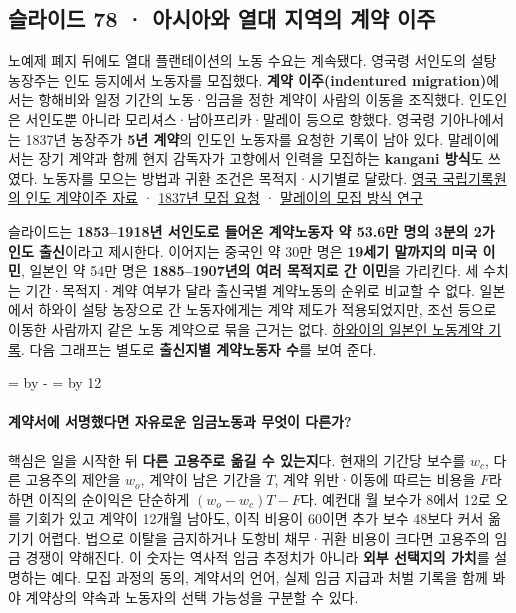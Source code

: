 \documentclass[10pt,a4paper]{article}
\newcommand{\ReserveQuestionSpace}{%
  \par\begingroup
  \dimen0=\pagegoal \advance\dimen0 by -\pagetotal
  \dimen2=\baselineskip \multiply\dimen2 by 12
  \ifdim\dimen0<\dimen2 \newpage\fi
  \endgroup}
\begin{document}
\subsection{슬라이드 78 · 아시아와 열대 지역의 계약 이주}
노예제 폐지 뒤에도 열대 플랜테이션의 노동 수요는 계속됐다. 영국령 서인도의 설탕 농장주는 인도 등지에서 노동자를 모집했다. \textbf{계약 이주(indentured migration)}에서는 항해비와 일정 기간의 노동·임금을 정한 계약이 사람의 이동을 조직했다. 인도인은 서인도뿐 아니라 모리셔스·남아프리카·말레이 등으로 향했다. 영국령 기아나에서는 1837년 농장주가 \textbf{5년 계약}의 인도인 노동자를 요청한 기록이 남아 있다. 말레이에서는 장기 계약과 함께 현지 감독자가 고향에서 인력을 모집하는 \textbf{kangani 방식}도 쓰였다. 노동자를 모으는 방법과 귀환 조건은 목적지·시기별로 달랐다. \href{https://www.nationalarchives.gov.uk/help-with-your-research/research-guides/indian-indentured-labourers/}{영국 국립기록원의 인도 계약이주 자료} · \href{https://www.nationalarchives.gov.uk/education/outreach/projects/migration-histories/indian-indentured-labour/}{1837년 모집 요청} · \href{https://www.cambridge.org/core/services/aop-cambridge-core/content/view/965FE650CE156420C32B0FE4A8261AEA/S0020859012000478a.pdf/labour-brokers-in-migration-understanding-historical-and-contemporary-transnational-migration-regimes-in-malayamalaysia.pdf}{말레이의 모집 방식 연구}\par

슬라이드는 \textbf{1853–1918년 서인도로 들어온 계약노동자 약 53.6만 명의 3분의 2가 인도 출신}이라고 제시한다. 이어지는 중국인 약 30만 명은 \textbf{19세기 말까지의 미국 이민}, 일본인 약 54만 명은 \textbf{1885–1907년의 여러 목적지로 간 이민}을 가리킨다. 세 수치는 기간·목적지·계약 여부가 달라 출신국별 계약노동의 순위로 비교할 수 없다. 일본에서 하와이 설탕 농장으로 간 노동자에게는 계약 제도가 적용되었지만, 조선 등으로 이동한 사람까지 같은 노동 계약으로 묶을 근거는 없다. \href{https://www2.hawaii.edu/\%7Especcoll/p\_mcbryde.html}{하와이의 일본인 노동계약 기록}. 다음 그래프는 별도로 \textbf{출신지별 계약노동자 수}를 보여 준다.\par

\ReserveQuestionSpace
\paragraph{계약서에 서명했다면 자유로운 임금노동과 무엇이 다른가?}
핵심은 일을 시작한 뒤 \textbf{다른 고용주로 옮길 수 있는지}다. 현재의 기간당 보수를 $w_c$, 다른 고용주의 제안을 $w_o$, 계약이 남은 기간을 $T$, 계약 위반·이동에 따르는 비용을 $F$라 하면 이직의 순이익은 단순하게 $(w_o-w_c)T-F$다. 예컨대 월 보수가 8에서 12로 오를 기회가 있고 계약이 12개월 남아도, 이직 비용이 60이면 추가 보수 48보다 커서 옮기기 어렵다. 법으로 이탈을 금지하거나 도항비 채무·귀환 비용이 크다면 고용주의 임금 경쟁이 약해진다. 이 숫자는 역사적 임금 추정치가 아니라 \textbf{외부 선택지의 가치}를 설명하는 예다. 모집 과정의 동의, 계약서의 언어, 실제 임금 지급과 처벌 기록을 함께 봐야 계약상의 약속과 노동자의 선택 가능성을 구분할 수 있다.\par
\end{document}
